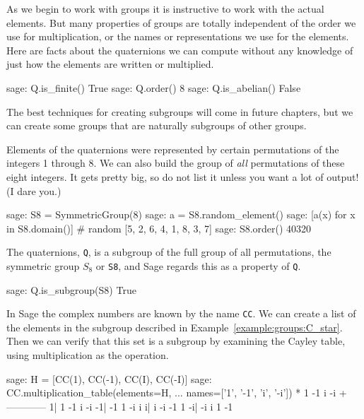 %
As we begin to work with groups it is instructive to work with the actual elements.  But many properties of groups are totally independent of the order we use for multiplication, or the names or representations we use for the elements.  Here are facts about the quaternions we can compute without any knowledge of just how the elements are written or multiplied.
%
\begin{sageexample}
sage: Q.is_finite()
True
sage: Q.order()
8
sage: Q.is_abelian()
False
\end{sageexample}
%
%
The best techniques for creating subgroups will come in future chapters, but we can create some groups that are naturally subgroups of other groups.\par
%
Elements of the quaternions were represented by certain permutations of the integers 1 through 8.  We can also build the group of \emph{all} permutations of these eight integers.  It gets pretty big, so do not list it unless you want a lot of output!  (I dare you.)
%
\begin{sageexample}
sage: S8 = SymmetricGroup(8)
sage: a = S8.random_element()
sage: [a(x) for x in S8.domain()]     # random
[5, 2, 6, 4, 1, 8, 3, 7]
sage: S8.order()
40320
\end{sageexample}
%
The quaternions, \verb?Q?, is a subgroup of the full group of all permutations, the symmetric group $S_8$ or \verb?S8?, and Sage regards this as a property of \verb?Q?.
%
\begin{sageexample}
sage: Q.is_subgroup(S8)
True
\end{sageexample}
%
In Sage the complex numbers are known by the name \verb?CC?.  We can create a list of the elements in the subgroup described in Example~\ref{example:groups:C_star}.  Then we can verify that this set is a subgroup by examining the Cayley table, using multiplication as the operation.
%
\begin{sageexample}
sage: H = [CC(1), CC(-1), CC(I), CC(-I)]
sage: CC.multiplication_table(elements=H,
...                           names=['1', '-1', 'i', '-i'])
 *   1 -1  i -i
  +------------
 1|  1 -1  i -i
-1| -1  1 -i  i
 i|  i -i -1  1
-i| -i  i  1 -1
\end{sageexample}
%
\begin{sageverbatim}
\end{sageverbatim}
%











